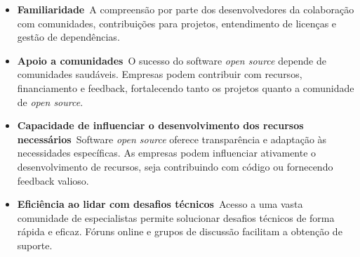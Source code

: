 \begin{itemize}

\item \textbf{Familiaridade}\
A compreensão por parte dos desenvolvedores da colaboração com comunidades, contribuições para projetos, entendimento de licenças e gestão de dependências.

\item \textbf{Apoio a comunidades}\
O sucesso do software \textit{open source} depende de comunidades saudáveis. Empresas podem contribuir com recursos, financiamento e feedback, fortalecendo tanto os projetos quanto a comunidade de \textit{open source}.

\item \textbf{Capacidade de influenciar o desenvolvimento dos recursos necessários}\
Software \textit{open source} oferece transparência e adaptação às necessidades específicas. As empresas podem influenciar ativamente o desenvolvimento de recursos, seja contribuindo com código ou fornecendo feedback valioso.

\item \textbf{Eficiência ao lidar com desafios técnicos}\
Acesso a uma vasta comunidade de especialistas permite solucionar desafios técnicos de forma rápida e eficaz. Fóruns online e grupos de discussão facilitam a obtenção de suporte.
\end{itemize}
